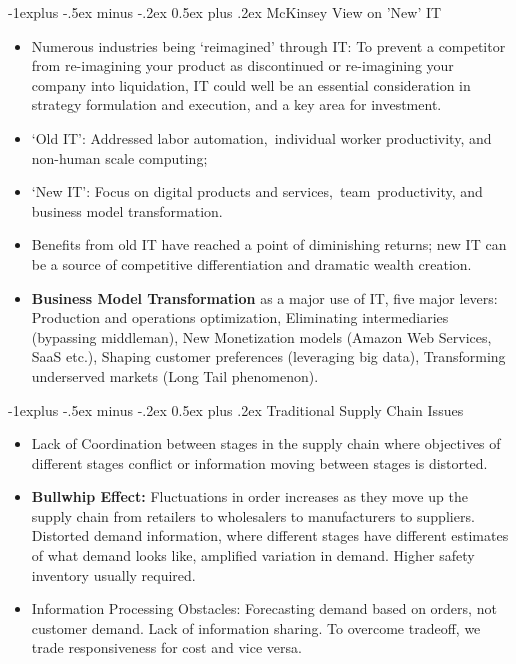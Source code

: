 \documentclass[12pt, landscape]{article}
\makeatletter
\renewcommand{\subsection}{\@startsection{subsection}{2}{0mm}%
                                {-1explus -.5ex minus -.2ex}%
                                {0.5ex plus .2ex}%
                                {\normalfont\normalsize\bfseries}}
\makeatother
\begin{document}
\begin{multicols*}{3}
\subsection{McKinsey View on 'New' IT}
\begin{itemize}
\item Numerous industries being `reimagined' through IT: To prevent a competitor from re-imagining your product as discontinued or re-imagining your company into liquidation, IT could well be an essential consideration in strategy formulation and execution, and a key area for investment.
\item `Old IT': Addressed labor automation, individual worker productivity, and non-human scale computing;
\item `New IT': Focus on digital products and services, team productivity, and business model transformation.
\item Benefits from old IT have reached a point of diminishing returns; new IT can be a source of competitive differentiation and dramatic wealth creation.
\item \textbf{Business Model Transformation} as a major use of IT, five major levers: Production and operations optimization, Eliminating intermediaries (bypassing middleman), New Monetization models (Amazon Web Services, SaaS etc.), Shaping customer preferences (leveraging big data), Transforming underserved markets (Long Tail phenomenon).
\end{itemize}

\subsection{Traditional Supply Chain Issues}
\begin{itemize}
\item Lack of Coordination between stages in the supply chain where objectives of different stages conflict or information moving between stages is distorted.
\item \textbf{Bullwhip Effect:} Fluctuations in order increases as they move up the supply chain from retailers to wholesalers to manufacturers to suppliers. Distorted demand information, where different stages have different estimates of what demand looks like, amplified variation in demand. Higher safety inventory usually required.
\item Information Processing Obstacles: Forecasting demand based on orders, not customer demand. Lack of information sharing. To overcome tradeoff, we trade responsiveness for cost and vice versa.
\end{itemize}


\end{multicols*}
\end{document}
